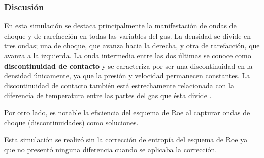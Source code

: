 \subsubsection{Discusión}
En esta simulación se destaca principalmente la manifestación de ondas de choque y de rarefacción en todas las variables del gas. La densidad se divide en tres ondas; una de choque, que avanza hacia la derecha, y otra de rarefacción, que avanza a la izquierda. La onda intermedia entre las dos últimas se conoce como \textbf{discontinuidad de contacto} \cite{thesis-euler-godunov} y se caracteriza por ser una discontinuidad en la densidad únicamente, ya que la presión y velocidad permanecen constantes. La discontinuidad de contacto también está estrechamente relacionada con la diferencia de temperatura entre las partes del gas que ésta divide \cite{LeVeque}. 

Por otro lado, es notable la eficiencia del esquema de Roe al capturar ondas de choque (discontinuidades) como soluciones.

Esta simulación se realizó sin la corrección de entropía del esquema de Roe ya que no presentó ninguna diferencia cuando se aplicaba la corrección.
